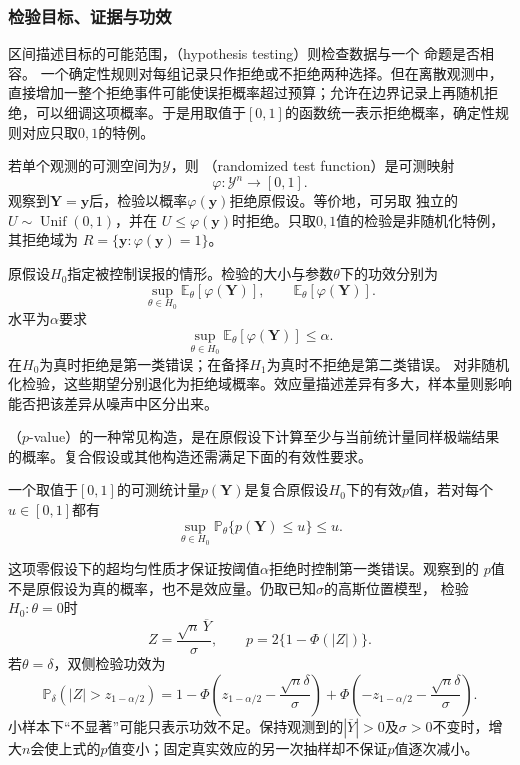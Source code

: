 \subsubsection{检验目标、证据与功效}
\label{sec:statistics-testing-errors}
\label{sec:statistics-selection-multiplicity}
区间描述目标的可能范围，（hypothesis testing）则检查数据与一个
命题是否相容。
一个确定性规则对每组记录只作拒绝或不拒绝两种选择。但在离散观测中，直接增加一整个拒绝事件可能使误拒概率超过预算；允许在边界记录上再随机拒绝，可以细调这项概率。于是用取值于\([0,1]\)的函数统一表示拒绝概率，确定性规则对应只取\(0,1\)的特例。
\begin{definition}[随机化检验函数]
  \label{def:statistics-randomized-test-function}
  若单个观测的可测空间为\(\mathcal{Y}\)，则
  （randomized test function）是可测映射
  \[
    \varphi:\mathcal{Y}^n\to[0,1].
  \]
  观察到\(\bm{Y}=\bm{y}\)后，检验以概率\(\varphi(\bm{y})\)拒绝原假设。等价地，可另取
  独立的\(U\sim\operatorname{Unif}(0,1)\)，并在
  \(U\leq\varphi(\bm{y})\)时拒绝。只取\(0,1\)值的检验是非随机化特例，其拒绝域为
  \(R=\{\bm{y}:\varphi(\bm{y})=1\}\)。
\end{definition}

原假设\(H_0\)指定被控制误报的情形。检验的大小与参数\(\theta\)下的功效分别为
\[
  \sup_{\theta\in H_0}\mathbb{E}_\theta[\varphi(\bm Y)],
  \qquad
  \mathbb{E}_\theta[\varphi(\bm Y)].
\]
水平为\(\alpha\)要求
\[
  \sup_{\theta\in H_0}
  \mathbb{E}_\theta[\varphi(\bm Y)]
  \leq\alpha.
\]
在\(H_0\)为真时拒绝是第一类错误；在备择\(H_1\)为真时不拒绝是第二类错误。
对非随机化检验，这些期望分别退化为拒绝域概率。效应量描述差异有多大，样本量则影响
能否把该差异从噪声中区分出来。

（\(p\)-value）的一种常见构造，是在原假设下计算至少与当前统计量同样极端结果的概率。复合假设或其他构造还需满足下面的有效性要求。
\begin{definition}[有效p值]
  \label{def:statistics-valid-p-value}
  一个取值于\([0,1]\)的可测统计量\(p(\bm Y)\)是复合原假设\(H_0\)下的有效\(p\)值，若对每个
\(u\in[0,1]\)都有
\[
  \sup_{\theta\in H_0}\mathbb{P}_\theta\{p(\bm Y)\leq u\}\leq u.
\]
\end{definition}
这项零假设下的超均匀性质才保证按阈值\(\alpha\)拒绝时控制第一类错误。观察到的
\(p\)值不是原假设为真的概率，也不是效应量。仍取已知\(\sigma\)的高斯位置模型，
检验\(H_0:\theta=0\)时
\[
  Z=\frac{\sqrt n\,\overline Y}{\sigma},\qquad
  p=2\{1-\Phi(|Z|)\}.
\]
若\(\theta=\delta\)，双侧检验功效为
\[
  \mathbb{P}_\delta(|Z|>z_{1-\alpha/2})
  =
  1-\Phi\left(z_{1-\alpha/2}-\frac{\sqrt n\delta}{\sigma}\right)
  +\Phi\left(-z_{1-\alpha/2}-\frac{\sqrt n\delta}{\sigma}\right).
\]
小样本下“不显著”可能只表示功效不足。保持观测到的\(|\overline Y|>0\)及\(\sigma>0\)不变时，增大\(n\)会使上式的\(p\)值变小；固定真实效应的另一次抽样却不保证\(p\)值逐次减小。

